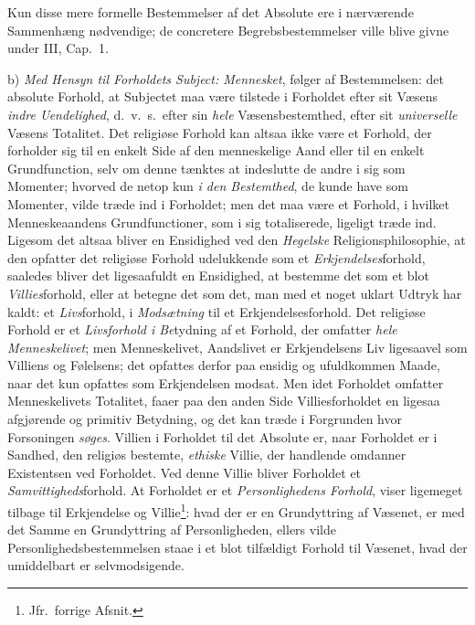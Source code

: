 Kun disse mere formelle Bestemmelser af det Absolute ere i nærværende
Sammenhæng nødvendige; de concretere Begrebsbestemmelser ville blive givne
under III, Cap.\ 1.

b) \emph{Med Hensyn til Forholdets Subject: Mennesket}, følger af
Bestemmelsen: det absolute Forhold, at Subjectet maa være tilstede i Forholdet
efter sit Væsens \emph{indre Uendelighed}, d.\ v.\ s.\ efter sin \emph{hele}
Væsensbestemthed, efter sit \emph{universelle} Væsens Totalitet. Det religiøse
Forhold kan altsaa ikke være et Forhold, der forholder sig til en enkelt Side
af den menneskelige Aand eller til en enkelt Grundfunction, selv om denne
tænktes at indeslutte de andre i sig som Momenter; hvorved de netop kun
\emph{i den Bestemthed}, de kunde have som Momenter, vilde træde ind i
Forholdet; men det maa være et Forhold, i hvilket Menneskeaandens
Grundfunctioner, som i sig totaliserede, ligeligt træde ind. Ligesom det
altsaa bliver en Ensidighed ved den \emph{Hegelske} Religionsphilosophie, at
den opfatter det religiøse Forhold udelukkende som et \emph{Erkjendelses}forhold,
saaledes bliver det ligesaafuldt en Ensidighed, at bestemme det som et blot
\emph{Villies}forhold, eller at betegne det som det, man med et noget uklart
Udtryk har kaldt: et \emph{Livs}forhold, i \emph{Modsætning} til et
Erkjendelsesforhold. Det religiøse Forhold er et \emph{Livsforhold i Be}tydning
af et Forhold, der omfatter \emph{hele Menneskelivet}; men Menneskelivet,
Aandslivet er Erkjendelsens Liv ligesaavel som Villiens og Følelsens; det
opfattes derfor paa ensidig og ufuldkommen Maade, naar det kun opfattes som
Erkjendelsen modsat. Men idet Forholdet omfatter Menneskelivets Totalitet,
faaer paa den anden Side Villiesforholdet en ligesaa afgjørende og primitiv
Betydning, og det
 \setcounter{footnote}{0}%
kan træde i Forgrunden hvor Forsoningen \emph{søges}. Villien i Forholdet til
det Absolute er, naar Forholdet er i Sandhed, den religiøs bestemte,
\emph{ethiske} Villie, der handlende omdanner Existentsen ved Forholdet. Ved
denne Villie bliver Forholdet et \emph{Samvittigheds}forhold. At Forholdet er
et \emph{Personlighedens Forhold}, viser ligemeget tilbage til Erkjendelse og
Villie\footnote{Jfr.\ forrige Afsnit.}: hvad der er en Grundyttring af
Væsenet, er med det Samme en Grundyttring af Personligheden, ellers vilde
Personlighedsbestemmelsen staae i et blot tilfældigt Forhold til Væsenet, hvad
der umiddelbart er selvmodsigende.

